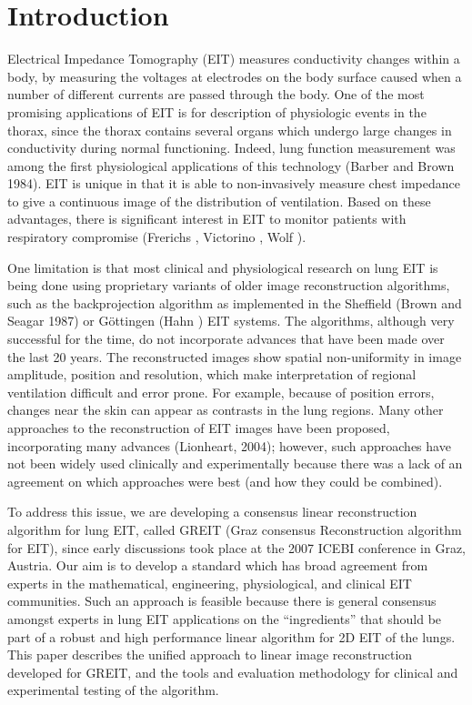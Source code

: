 \documentclass[12pt]{iopart}
\begin{document}
\section{Introduction}
Electrical Impedance Tomography (EIT) measures conductivity
changes within a body, by measuring the voltages at electrodes
on the body surface caused when a number of different
currents are passed through the body.
One of the most promising
applications of EIT is for description of physiologic events
in the thorax, since the thorax contains several
organs which undergo large changes in conductivity
during normal functioning. Indeed, lung function measurement
was among the first physiological applications of this technology
 (Barber and Brown 1984).
EIT is unique in that it is able to non-invasively
measure chest impedance to give a continuous
image of the distribution of ventilation.
Based on these advantages, there is significant
interest in EIT to 
monitor patients with respiratory compromise
(Frerichs , Victorino , Wolf ).

One limitation is that most clinical and physiological research
on lung EIT is being done using proprietary variants of
older image reconstruction algorithms, such as the backprojection
algorithm as implemented
in the Sheffield (Brown and Seagar 1987)
or G\"ottingen (Hahn ) EIT systems.
The algorithms, although very successful for the time,
   do not incorporate advances that have been made over the last
   20 years.
The reconstructed images show
   spatial non-uniformity in image amplitude, position
   and resolution, which make interpretation of regional
   ventilation difficult and error prone.
For example, because of position errors,
changes near the skin can appear as contrasts in the lung regions.
Many other approaches to the reconstruction of EIT images have been
proposed, incorporating many advances (Lionheart, 2004);
however, such approaches
have not been widely used clinically and experimentally
because there was a lack of an agreement on which
approaches were best (and how they could be combined).

To address this issue, we are developing a
consensus linear reconstruction algorithm for lung EIT,
called GREIT (Graz consensus Reconstruction algorithm for EIT),
since early discussions took place at the 2007 ICEBI conference
in Graz, Austria. Our aim is to develop a standard which
has broad agreement from experts in the mathematical,
engineering, physiological, and clinical EIT communities.
Such an approach is feasible because there is general
consensus amongst experts in lung EIT applications on
the ``ingredients'' that should
be part of a robust and high performance linear algorithm
for 2D EIT of the lungs.
This paper describes the unified approach to 
linear image reconstruction developed for GREIT,
and the tools and evaluation methodology for
clinical and experimental testing of the algorithm.
\end{document}
